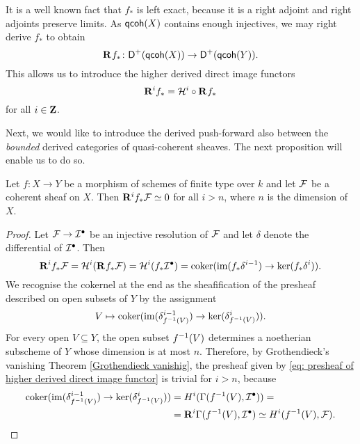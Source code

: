 It is a well known fact that $f_*$ is left exact, because it is a right adjoint and right adjoints preserve limits. As $\mathsf{qcoh}(X)$ contains enough injectives, we may right derive $f_*$ to obtain 
\[
    \mathbf{R}^{}f_* \colon \mathsf{D}^+(\mathsf{qcoh}(X)) \to \mathsf{D}^+(\mathsf{qcoh}(Y)).
\]
This allows us to introduce the higher derived direct image functors
\[
    \mathbf{R}^{i}f_* = \mathcal H^i \circ \mathbf{R}^{}f_*
\] 
for all $i \in \mathbf Z$.

Next, we would like to introduce the derived push-forward also between the \emph{bounded} derived categories of quasi-coherent sheaves. The next proposition will enable us to do so. 

\begin{proposition}
    Let $f \colon X \to Y$ be a morphism of schemes of finite type over $k$ and let $\mathcal F$ be a coherent sheaf on $X$. Then $\mathbf{R}^{i}f_*\mathcal F \simeq 0$ for all $i > n$, where $n$ is the dimension of $X$.
\end{proposition}

\begin{proof}
    Let $\mathcal F \to \mathcal I^\bullet$ be an injective resolution of $\mathcal F$ and let $\delta$ denote the differential of $\mathcal I^\bullet$. Then 
    \[
        \mathbf{R}^{i}f_*\mathcal F = \mathcal H^i(\mathbf{R}^{}f_*\mathcal F) = \mathcal H^i (f_*\mathcal I^\bullet) = \operatorname{coker}(\operatorname{im}(f_*\delta^{i-1}) \to \ker(f_*\delta^i)).
    \]
    We recognise the cokernel at the end as the sheafification of the presheaf described on open subsets of $Y$ by the assignment
    \begin{equation}
        \label{eq: presheaf of higher derived direct image functor}
        V \mapsto \operatorname{coker}(\operatorname{im}(\delta^{i-1}_{f^{-1}(V)}) \to \ker(\delta^i_{f^{-1}(V)})).
    \end{equation}
    For every open $V \subseteq Y$, the open subset $f^{-1}(V)$ determines a noetherian subscheme of $Y$ whose dimension is at most $n$. Therefore, by Grothendieck's vanishing Theorem \ref{Grothendieck vanishig}, the presheaf given by \eqref{eq: presheaf of higher derived direct image functor} is trivial for $i > n$, because 
    \begin{align*}
        \operatorname{coker}(\operatorname{im}(\delta^{i-1}_{f^{-1}(V)}) \to \ker(\delta^i_{f^{-1}(V)})) &= H^i(\Gamma(f^{-1}(V), \mathcal I^\bullet)) = \\
        &= \mathbf{R}^{i}\Gamma(f^{-1}(V), \mathcal I^\bullet) \simeq H^{i}(f^{-1}(V), \mathcal F).
        \qedhere
    \end{align*} 
\end{proof}

